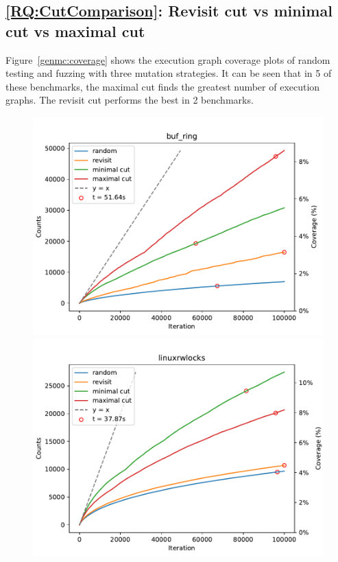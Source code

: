 \subsection{\ref*{RQ:CutComparison}: Revisit cut vs minimal cut vs maximal cut }

Figure~\ref{genmc:coverage} shows the execution graph coverage plots of random testing and fuzzing with three mutation strategies. It can be seen that in 5 of these benchmarks, the maximal cut finds the greatest number of execution graphs. The revisit cut performs the best in 2 benchmarks.

\begin{figure}[h!]

	\centering
	\begin{minipage}{0.45\textwidth}
		\centering
		\includegraphics[width=\textwidth]{figure/genmc/buf_ring.pdf}
	\end{minipage}
	\hfill
	\begin{minipage}{0.45\textwidth}
		\centering
		\includegraphics[width=\textwidth]{figure/genmc/linuxrwlocks.pdf}
	\end{minipage}


\end{figure}
